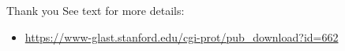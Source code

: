 \documentclass[12pt]{beamer}
\begin{document}
\begin{frame}{Thank you}
  See text for more details:
  \begin{itemize}
    \item
  \url{https://www-glast.stanford.edu/cgi-prot/pub_download?id=662}
  \end{itemize}

\end{frame}
\end{document}
